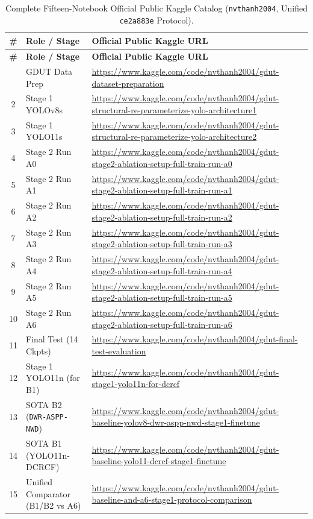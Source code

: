 \begingroup\scriptsize\setlength{\tabcolsep}{4pt}\renewcommand{\arraystretch}{1.08}
\begin{longtable}{|c|p{3.4cm}|p{10.3cm}|}
\caption{Complete Fifteen-Notebook Official Public Kaggle Catalog (\texttt{nvthanh2004}, Unified \texttt{ce2a883e} Protocol).}
\label{tab:app_kaggle_thanh} \\
\hline
\rowcolor{slatehdr}
\textbf{\#} & \textbf{Role / Stage} & \textbf{Official Public Kaggle URL} \\
\hline
\endfirsthead
\hline
\rowcolor{slatehdr}
\textbf{\#} & \textbf{Role / Stage} & \textbf{Official Public Kaggle URL} \\
\hline
\endhead
\hline
\endfoot
1 & GDUT Data Prep & \url{https://www.kaggle.com/code/nvthanh2004/gdut-dataset-preparation} \\ \hline
2 & Stage 1 YOLOv8s & \url{https://www.kaggle.com/code/nvthanh2004/gdut-structural-re-parameterize-yolo-architecture1} \\ \hline
3 & Stage 1 YOLO11s & \url{https://www.kaggle.com/code/nvthanh2004/gdut-structural-re-parameterize-yolo-architecture2} \\ \hline
4 & Stage 2 Run A0 & \url{https://www.kaggle.com/code/nvthanh2004/gdut-stage2-ablation-setup-full-train-run-a0} \\ \hline
5 & Stage 2 Run A1 & \url{https://www.kaggle.com/code/nvthanh2004/gdut-stage2-ablation-setup-full-train-run-a1} \\ \hline
6 & Stage 2 Run A2 & \url{https://www.kaggle.com/code/nvthanh2004/gdut-stage2-ablation-setup-full-train-run-a2} \\ \hline
7 & Stage 2 Run A3 & \url{https://www.kaggle.com/code/nvthanh2004/gdut-stage2-ablation-setup-full-train-run-a3} \\ \hline
8 & Stage 2 Run A4 & \url{https://www.kaggle.com/code/nvthanh2004/gdut-stage2-ablation-setup-full-train-run-a4} \\ \hline
9 & Stage 2 Run A5 & \url{https://www.kaggle.com/code/nvthanh2004/gdut-stage2-ablation-setup-full-train-run-a5} \\ \hline
10 & Stage 2 Run A6 & \url{https://www.kaggle.com/code/nvthanh2004/gdut-stage2-ablation-setup-full-train-run-a6} \\ \hline
11 & Final Test (14 Ckpts) & \url{https://www.kaggle.com/code/nvthanh2004/gdut-final-test-evaluation} \\ \hline
12 & Stage 1 YOLO11n (for B1) & \url{https://www.kaggle.com/code/nvthanh2004/gdut-stage1-yolo11n-for-dcrcf} \\ \hline
13 & SOTA B2 (\texttt{DWR-ASPP-NWD}) & \url{https://www.kaggle.com/code/nvthanh2004/gdut-baseline-yolov8-dwr-aspp-nwd-stage1-finetune} \\ \hline
14 & SOTA B1 (YOLO11n-DCRCF) & \url{https://www.kaggle.com/code/nvthanh2004/gdut-baseline-yolo11-dcrcf-stage1-finetune} \\ \hline
15 & Unified Comparator (B1/B2 vs A6) & \url{https://www.kaggle.com/code/nvthanh2004/gdut-baseline-and-a6-stage1-protocol-comparison} \\ \hline
\end{longtable}
\endgroup

